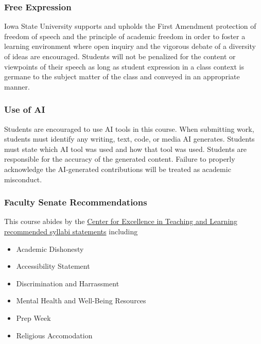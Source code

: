 \documentclass[12pt]{article}
\begin{document}
\subsubsection*{Free Expression}

Iowa State University supports and upholds the First Amendment protection of freedom of speech and the principle of academic freedom in order to foster a learning environment where open inquiry and the vigorous debate of a diversity of ideas are encouraged. Students will not be penalized for the content or viewpoints of their speech as long as student expression in a class context is germane to the subject matter of the class and conveyed in an appropriate manner.

\subsubsection*{Use of AI}

Students are encouraged to use AI tools in this course. When submitting work, students must identify any writing, text, code, or media AI generates.
Students must state which AI tool was used and how that tool was used.
Students are responsible for the accuracy of the generated content.
Failure to properly acknowledge the AI-generated contributions will be treated as academic misconduct.

\subsubsection*{Faculty Senate Recommendations}

This course abides by the
\href{https://www.celt.iastate.edu/instructional-strategies/preparing-to-teach/how-to-create-an-effective-syllabus/recommended-iowa-state-university-syllabus-statements/}{Center for Excellence in Teaching and Learning recommended syllabi statements}
including
\begin{itemize}
\item Academic Dishonesty
\item Accessibility Statement
\item Discrimination and Harrassment
\item Mental Health and Well-Being Resources
\item Prep Week
\item Religious Accomodation
\end{itemize}
\end{document}
